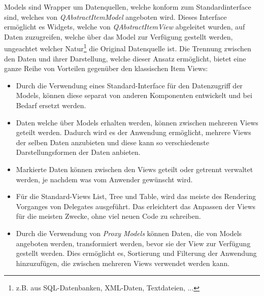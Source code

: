 \documentclass[11pt,a4paper,titlepage]{scrreprt}
\begin{document}
Models sind Wrapper um Datenquellen, welche konform zum Standardinterface sind, welches
von {\itshape QAbstractItemModel} angeboten wird. Dieses Interface ermöglicht es Widgets,
welche von {\itshape QAbstractItemView} abgeleitet wurden, auf Daten zuzugreifen, welche 
über das Model zur Verfügung gestellt werden, ungeachtet welcher Natur\footnote{z.B.
aus SQL-Datenbanken, XML-Daten, Textdateien, ...} die Original Datenquelle ist.
Die Trennung zwischen den Daten und ihrer Darstellung, welche dieser Ansatz ermöglicht,
bietet eine ganze Reihe von Vorteilen gegenüber den klassischen Item Views:
\begin{itemize}
\item Durch die Verwendung eines Standard-Interface für den Datenzugriff der Models,
können diese separat von anderen Komponenten entwickelt und bei Bedarf ersetzt werden.
\item Daten welche über Models erhalten werden, können zwischen mehreren Views geteilt werden.
Dadurch wird es der Anwendung ermöglicht, mehrere Views der selben Daten anzubieten und diese
kann so verschiedenste Darstellungsformen der Daten anbieten.
\item Markierte Daten können zwischen den Views geteilt oder getrennt verwaltet werden, je
nachdem was vom Anwender gewünscht wird.
\item Für die Standard-Views List, Tree und Table, wird das meiste des Rendering Vorganges von
Delegates ausgeführt. Das erleichtert das Anpassen der Views für die meisten Zwecke, ohne
viel neuen Code zu schreiben.
\item Durch die Verwendung von {\itshape Proxy Models} können Daten, die von Models angeboten
werden, transformiert werden, bevor sie der View zur Verfügung gestellt werden. Dies ermöglicht
es, Sortierung und Filterung der Anwendung hinzuzufügen, die zwischen mehreren Views verwendet
werden kann.
\end{itemize}

\newpage
\nocite{*}
{}

\end{document}
